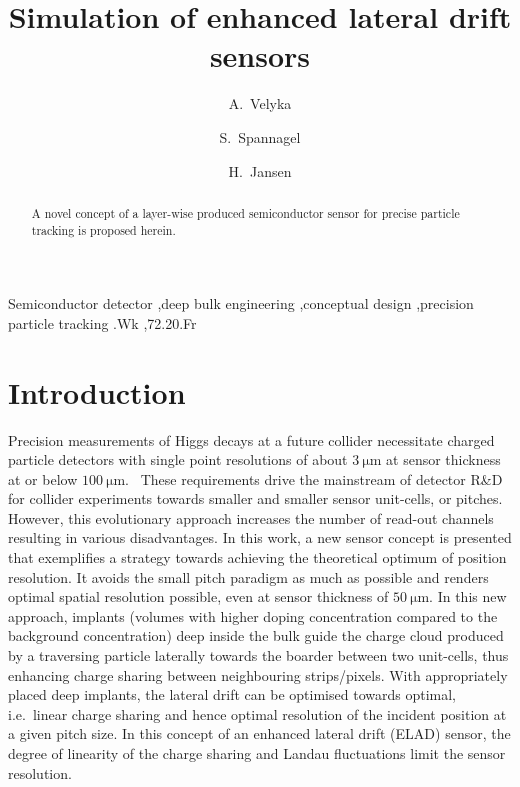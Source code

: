 \documentclass[preprint]{elsarticle}
\begin{document}
\begin{frontmatter}


\title{Simulation of enhanced lateral drift sensors}

\author[desy]{A.~Velyka}
\address[desy]{Notkestr. 85, 22607 Hamburg, Germany}

\author[cern]{S.~Spannagel}

\address[cern]{Route de , Geneva, Switzerland}

\author[desy]{H.~Jansen}



\begin{abstract}
A novel concept of a layer-wise produced semiconductor sensor for precise particle tracking is proposed herein. 

\end{abstract}

\begin{keyword}
Semiconductor detector \sep deep bulk engineering \sep conceptual design \sep precision particle tracking
.Wk \sep 72.20.Fr
\end{keyword}

\end{frontmatter}

\linenumbers
\section{Introduction}
Precision measurements of Higgs decays at a future collider necessitate charged particle detectors with single point resolutions of about $\SI{3}{\um}$ at sensor thickness at or below $\SI{100}{\um}$.~\cite{DominiksCLICNote}
These requirements drive the mainstream  of detector R\&D for collider experiments towards smaller and smaller sensor unit-cells, or pitches.
However, this evolutionary approach increases the number of read-out channels resulting in various disadvantages. 
In this work, a new sensor concept is presented that exemplifies a strategy towards achieving the theoretical optimum of position resolution. 
It avoids the small pitch paradigm as much as possible and renders optimal spatial resolution possible, even at sensor thickness of $\SI{50}{\um}$.
In this new approach, implants (volumes with higher doping concentration compared to the background concentration) deep inside the bulk guide the charge cloud produced by a traversing particle laterally towards
 the boarder between two unit-cells, thus enhancing charge sharing between neighbouring strips/pixels. 
With appropriately placed deep implants, the lateral drift can be optimised towards optimal, i.e.\ linear charge sharing and hence optimal resolution of the incident position at a given pitch size. 
In this concept of an enhanced lateral drift (ELAD) sensor, the degree of linearity of the charge sharing and Landau fluctuations limit the sensor resolution. %
 
\end{document}
